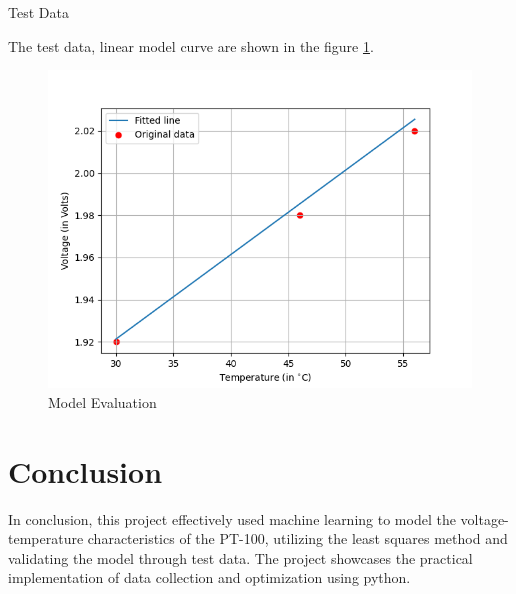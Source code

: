 \documentclass[journal,12pt,twocolumn]{IEEEtran}
\begin{document}
\begin{table}[h]
    \centering
    
    \caption{Test Data}
    \label{tab:2}
\end{table}

The test data, linear model curve are shown in the figure \ref{fig:3}.

\begin{figure}[ht]
    \centering
    \includegraphics[width=\columnwidth]{figs/Test.png}
    \caption{Model Evaluation}
    \label{fig:3}
\end{figure}

\section{Conclusion}
In conclusion, this project effectively used machine learning to model the voltage-temperature characteristics of the PT-100, utilizing the least squares method and validating the model through test data. The project showcases the practical implementation of data collection and optimization using python.
\end{document}
